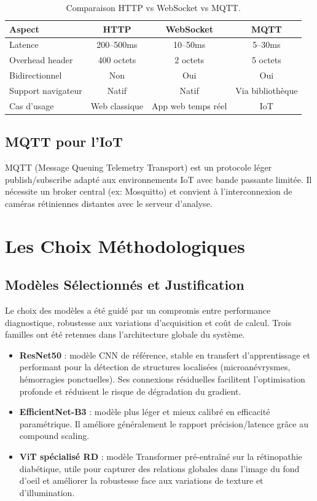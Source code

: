 \documentclass[12pt,a4paper,oneside]{report}
\begin{document}
\begin{table}[H]
\centering
\caption{Comparaison HTTP vs WebSocket vs MQTT.}
\label{tab:protocoles}
\begin{tabular}{|l|c|c|c|}
\hline
\textbf{Aspect} & \textbf{HTTP} & \textbf{WebSocket} & \textbf{MQTT} \\
\hline
Latence & 200--500ms & 10--50ms & 5--30ms \\
Overhead header & 400 octets & 2 octets & 5 octets \\
Bidirectionnel & Non & Oui & Oui \\
Support navigateur & Natif & Natif & Via bibliothèque \\
Cas d'usage & Web classique & App web temps réel & IoT \\
\hline
\end{tabular}
\end{table}

\subsection{MQTT pour l'IoT}

MQTT (Message Queuing Telemetry Transport) est un protocole léger
publish/subscribe adapté aux environnements IoT avec bande passante
limitée. Il nécessite un broker central (ex: Mosquitto) et convient
à l'interconnexion de caméras rétiniennes distantes avec le serveur
d'analyse.

\section{Les Choix Méthodologiques}

\subsection{Modèles Sélectionnés et Justification}

Le choix des modèles a été guidé par un compromis entre performance
diagnostique, robustesse aux variations d'acquisition et coût de calcul.
Trois familles ont été retenues dans l'architecture globale du système.

\begin{itemize}
    \item \textbf{ResNet50} : modèle CNN de référence, stable en transfert
        d'apprentissage et performant pour la détection de structures
        localisées (microanévrysmes, hémorragies ponctuelles). Ses
        connexions résiduelles facilitent l'optimisation profonde et
        réduisent le risque de dégradation du gradient.
    \item \textbf{EfficientNet-B3} : modèle plus léger et mieux calibré
        en efficacité paramétrique. Il améliore généralement le rapport
        précision/latence grâce au compound scaling.
    \item \textbf{ViT spécialisé RD} : modèle Transformer pré-entraîné
        sur la rétinopathie diabétique, utile pour capturer des relations
        globales dans l'image du fond d'oeil et améliorer la robustesse
        face aux variations de texture et d'illumination.
\end{itemize}
\end{document}
